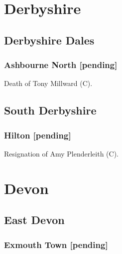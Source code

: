 \documentclass[a4paper,openany]{book}
\begin{document}
\begin{resultsiii}
\section{Derbyshire}

\subsection*{Derbyshire Dales}

\subsubsection*{Ashbourne North \hspace*{\fill}\nolinebreak[1]%
	\enspace\hspace*{\fill}
	[pending]}


Death of Tony Millward (C).

\subsection*{South Derbyshire}

\subsubsection*{Hilton \hspace*{\fill}\nolinebreak[1]%
\enspace\hspace*{\fill}
[pending]}


Resignation of Amy Plenderleith (C).

\section{Devon}

\subsection*{East Devon}

\subsubsection*{Exmouth Town \hspace*{\fill}\nolinebreak[1]%
	\enspace\hspace*{\fill}
	[pending]}


\end{resultsiii}
\end{document}
